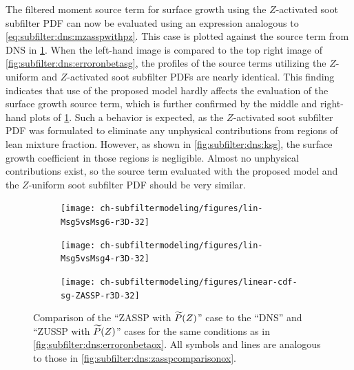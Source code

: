 The filtered moment source term for surface growth using the $Z$-activated soot subfilter PDF can now be evaluated using an expression analogous to \cref{eq:subfilter:dns:mzasspwithpz}. This case is plotted against the source term from DNS in \cref{fig:subfilter:dns:zasspcomparisonsg}. When the left-hand image is compared to the top right image of \cref{fig:subfilter:dns:erroronbetasg}, the profiles of the source terms utilizing the $Z$-uniform and $Z$-activated soot subfilter PDFs are nearly identical. This finding indicates that use of the proposed model hardly affects the evaluation of the surface growth source term, which is further confirmed by the middle and right-hand plots of \cref{fig:subfilter:dns:zasspcomparisonsg}. Such a behavior is expected, as the $Z$-activated soot subfilter PDF was formulated to eliminate any unphysical contributions from regions of lean mixture fraction. However, as shown in \cref{fig:subfilter:dns:ksg}, the surface growth coefficient in those regions is negligible. Almost no unphysical contributions exist, so the source term evaluated with the proposed model and the $Z$-uniform soot subfilter PDF should be very similar.

\begin{figure}[ht]
  \centering
  \begin{subfigure}[b]{0.33\linewidth}
    \centering
    \texttt{[image: ch-subfiltermodeling/figures/lin-Msg5vsMsg6-r3D-32]}
  \end{subfigure}%
  \begin{subfigure}[b]{0.33\linewidth}
    \centering
    \texttt{[image: ch-subfiltermodeling/figures/lin-Msg5vsMsg4-r3D-32]}
  \end{subfigure}%
  \begin{subfigure}[b]{0.33\linewidth}
    \centering
    \texttt{[image: ch-subfiltermodeling/figures/linear-cdf-sg-ZASSP-r3D-32]}
  \end{subfigure}
  \caption[Comparison of ZASSP with \texorpdfstring{$\pz$}{P(Z)} to DNS \& ZUSSP with \texorpdfstring{$\pz$}{P(Z)} for \texorpdfstring{$\fst[M]{1,0}^{sg}$}{M1,0sg}]{Comparison of the ``ZASSP with $\pz$'' case to the ``DNS'' and ``ZUSSP with $\pz$'' cases for the same conditions as in \cref{fig:subfilter:dns:erroronbetaox}. All symbols and lines are analogous to those in \cref{fig:subfilter:dns:zasspcomparisonox}.}
  \label{fig:subfilter:dns:zasspcomparisonsg}
\end{figure}


